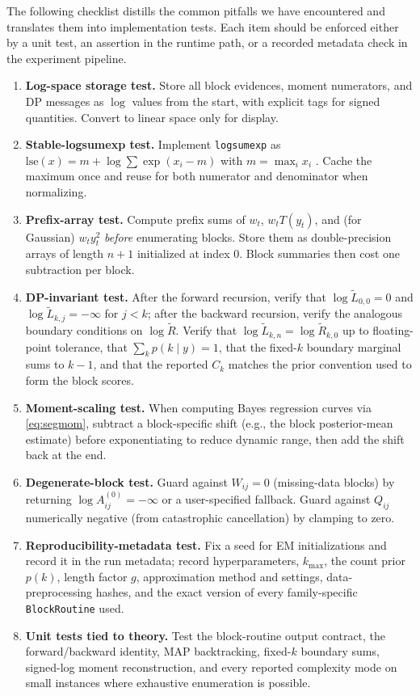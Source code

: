 The following checklist distills the common pitfalls we have encountered and translates them into
implementation tests. Each item should be enforced either by a unit test, an assertion in the
runtime path, or a recorded metadata check in the experiment pipeline.

\begin{enumerate}\itemsep2pt
\item \textbf{Log-space storage test.} Store all block evidences, moment numerators, and DP
messages as $\log$ values from the start, with explicit tags for signed quantities. Convert to
linear space only for display.
\item \textbf{Stable-logsumexp test.} Implement \texttt{logsumexp} as
$\mathrm{lse}(x)=m+\log\sum\exp(x_i-m)$ with $m=\max_i x_i$ \citep{blanchard2021lse}. Cache the
maximum once and reuse for both numerator and denominator when normalizing.
\item \textbf{Prefix-array test.} Compute prefix sums of $w_t$, $w_t T(y_t)$, and
(for Gaussian) $w_t y_t^2$ \emph{before} enumerating blocks. Store them as double-precision arrays
of length $n+1$ initialized at index 0. Block summaries then cost one subtraction per block.
\item \textbf{DP-invariant test.} After the forward recursion, verify that
$\log\widetilde L_{0,0}=0$ and $\log\widetilde L_{k,j}=-\infty$ for $j<k$; after the backward
recursion, verify the analogous boundary conditions on $\log\widetilde R$. Verify that
$\log\widetilde L_{k,n}=\log\widetilde R_{k,0}$ up to floating-point tolerance, that
$\sum_k p(k\mid y)=1$, that the fixed-$k$ boundary marginal sums to $k-1$, and that the reported
$C_k$ matches the prior convention used to form the block scores.
\item \textbf{Moment-scaling test.} When computing Bayes regression curves via \eqref{eq:segmom},
subtract a block-specific shift (e.g., the block posterior-mean estimate) before exponentiating
to reduce dynamic range, then add the shift back at the end.
\item \textbf{Degenerate-block test.} Guard against $W_{ij}=0$ (missing-data blocks) by returning
$\log A^{(0)}_{ij}=-\infty$ or a user-specified fallback. Guard against $Q_{ij}$ numerically
negative (from catastrophic cancellation) by clamping to zero.
\item \textbf{Reproducibility-metadata test.} Fix a seed for EM initializations and record it in the run
metadata; record hyperparameters, $k_{\max}$, the count prior $p(k)$, length factor $g$, approximation
method and settings, data-preprocessing hashes, and the exact version of every family-specific
\texttt{BlockRoutine} used.
\item \textbf{Unit tests tied to theory.} Test the block-routine output contract, the forward/backward
identity, MAP backtracking, fixed-$k$ boundary sums, signed-log moment reconstruction, and every
reported complexity mode on small instances where exhaustive enumeration is possible.
\end{enumerate}
